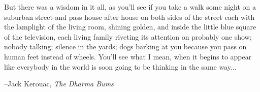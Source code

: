\documentclass{exam}
\begin{document}


\vspace{1.5 in}

\ifprintanswers
\else
\begin{em}
But there was a wisdom in it all, as you'll see if you take a walk some night on a suburban street and pass house after
house on both sides of the street each with the lamplight of the living room, shining golden, and inside the little blue
square of the television, each living family riveting its attention on probably one show; nobody talking; silence in the
yards; dogs barking at you because you pass on human feet instead of wheels.  You'll see what I mean, when it begins to
appear like everybody in the world is soon going to be thinking in the same way...
\end{em}

\vspace{.2 cm}
\hspace{1.5 cm} --Jack Kerouac, {\em The Dharma Bums}

\fi
\end{document}
